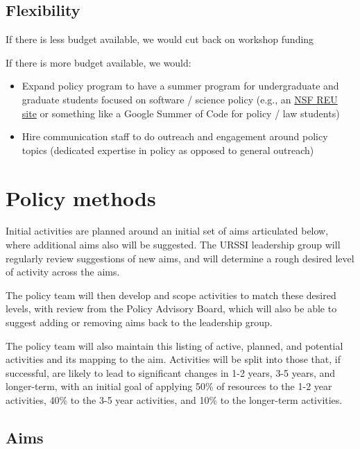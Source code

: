 \documentclass[
]{book}
\begin{document}
\hypertarget{flexibility}{%
\subsection{Flexibility}\label{flexibility}}

If there is less budget available, we would cut back on workshop funding

If there is more budget available, we would:

\begin{itemize}
\item
  Expand policy program to have a summer program for undergraduate and graduate students focused
  on software / science policy (e.g., an \href{https://www.nsf.gov/crssprgm/reu/faculty.jsp}{NSF REU site} or something like a Google Summer of Code for policy / law students)
\item
  Hire communication staff to do outreach and engagement around policy topics (dedicated
  expertise in policy as opposed to general outreach)
\end{itemize}

\hypertarget{policy-methods}{%
\section{Policy methods}\label{policy-methods}}

Initial activities are planned around an initial set of aims articulated below, where additional
aims also will be suggested. The URSSI leadership group will regularly review suggestions
of new aims, and will determine a rough desired level of activity across the aims.

The policy team will then develop and scope activities to match these desired levels, with review
from the Policy Advisory Board, which will also be able to suggest adding or removing aims
back to the leadership group.

The policy team will also maintain this listing of active, planned, and potential activities and
its mapping to the aim. Activities will be split into those that, if successful, are likely
to lead to significant changes in 1-2 years, 3-5 years, and longer-term, with an initial goal of
applying 50\% of resources to the 1-2 year activities, 40\% to the 3-5 year activities, and 10\% to
the longer-term activities.

\hypertarget{aims}{%
\subsection{Aims}\label{aims}}
\end{document}
